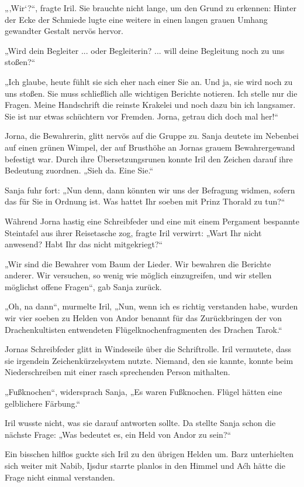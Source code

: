 „‚Wir‘?“, fragte Iril. Sie brauchte nicht lange, um den Grund zu erkennen: Hinter der Ecke der Schmiede lugte eine weitere in einen langen grauen Umhang gewandter Gestalt nervös hervor.

„Wird dein Begleiter ... oder Begleiterin? ... will deine Begleitung noch zu uns stoßen?“

„Ich glaube, heute fühlt sie sich eher nach einer Sie an. Und ja, sie wird noch zu uns stoßen. Sie muss schließlich alle wichtigen Berichte notieren. Ich stelle nur die Fragen. Meine Handschrift die reinste Krakelei und noch dazu bin ich langsamer. Sie ist nur etwas schüchtern vor Fremden. Jorna, getrau dich doch mal her!“

Jorna, die Bewahrerin, glitt nervös auf die Gruppe zu. Sanja deutete im Nebenbei auf einen grünen Wimpel, der auf Brusthöhe an Jornas grauem Bewahrergewand befestigt war. Durch ihre Übersetzungsrunen konnte Iril den Zeichen darauf ihre Bedeutung zuordnen. „Sieh da. Eine Sie.“

Sanja fuhr fort: „Nun denn, dann könnten wir uns der Befragung widmen, sofern das für Sie in Ordnung ist. Was hattet Ihr soeben mit Prinz Thorald zu tun?“

Während Jorna hastig eine Schreibfeder und eine mit einem Pergament bespannte Steintafel aus ihrer Reisetasche zog, fragte Iril verwirrt: „Wart Ihr nicht anwesend? Habt Ihr das nicht mitgekriegt?“

„Wir sind die Bewahrer vom Baum der Lieder. Wir bewahren die Berichte anderer. Wir versuchen, so wenig wie möglich einzugreifen, und wir stellen möglichst offene Fragen“, gab Sanja zurück.

„Oh, na dann“, murmelte Iril, „Nun, wenn ich es richtig verstanden habe, wurden wir vier soeben zu Helden von Andor benannt für das Zurückbringen der von Drachenkultisten entwendeten Flügelknochenfragmenten des Drachen Tarok.“

Jornas Schreibfeder glitt in Windeseile über die Schriftrolle. Iril vermutete, dass sie irgendein Zeichenkürzelsystem nutzte. Niemand, den sie kannte, konnte beim Niederschreiben mit einer rasch sprechenden Person mithalten.

„Fußknochen“, widersprach Sanja, „Es waren Fußknochen. Flügel hätten eine gelblichere Färbung.“

Iril wusste nicht, was sie darauf antworten sollte. Da stellte Sanja schon die nächste Frage: „Was bedeutet es, ein Held von Andor zu sein?“

Ein bisschen hilflos guckte sich Iril zu den übrigen Helden um. Barz unterhielten sich weiter mit Nabib, Ijsdur starrte planlos in den Himmel und Aćh hätte die Frage nicht einmal verstanden.

